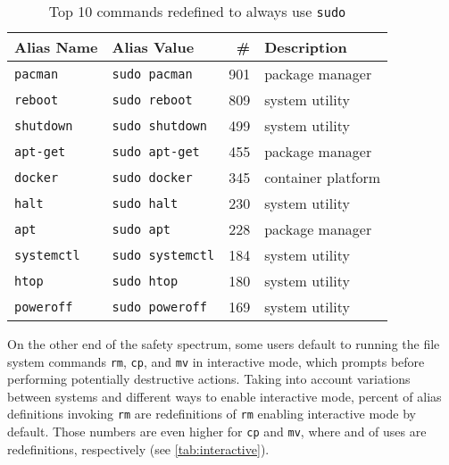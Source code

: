 \begin{table}
    \caption{Top 10 commands redefined to always use \texttt{sudo}}
    \label{tab:sudo-redefine}
    \begin{tabular}{llrl}
        \toprule
        Alias Name & Alias Value & \# & Description \\
        \midrule
        \verb|pacman|    & \verb|sudo pacman|    & 901 & package manager \\
        \verb|reboot|    & \verb|sudo reboot|    & 809 & system utility \\
        \verb|shutdown|  & \verb|sudo shutdown|  & 499 & system utility \\
        \verb|apt-get|   & \verb|sudo apt-get|   & 455 & package manager \\
        \verb|docker|    & \verb|sudo docker|    & 345 & container platform \\
        \verb|halt|      & \verb|sudo halt|      & 230 & system utility \\
        \verb|apt|       & \verb|sudo apt|       & 228 & package manager \\
        \verb|systemctl| & \verb|sudo systemctl| & 184 & system utility \\
        \verb|htop|      & \verb|sudo htop|      & 180 & system utility \\
        \verb|poweroff|  & \verb|sudo poweroff|  & 169 & system utility \\
        \bottomrule
    \end{tabular}
\end{table}

On the other end of the safety spectrum, some users default to running the file system commands \texttt{rm}, \texttt{cp}, and \texttt{mv} in interactive mode, which prompts before performing potentially destructive actions.
Taking into account variations between systems and different ways to enable interactive mode,  percent of alias definitions invoking \texttt{rm} are redefinitions of \texttt{rm} enabling interactive mode by default.
Those numbers are even higher for \texttt{cp} and \texttt{mv}, where  and  of uses are redefinitions, respectively (see \cref{tab:interactive}).

